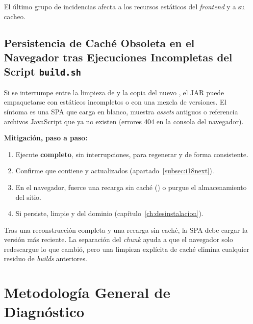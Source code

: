 El último grupo de incidencias afecta a los recursos estáticos del \textit{frontend} y a su
cacheo.\par

\subsection[Caché Obsoleta tras build.sh Incompleto]{Persistencia de Caché Obsoleta en el Navegador tras Ejecuciones Incompletas del Script \texttt{build.sh}}%
\label{sec:error-cache}

Si  se interrumpe entre la limpieza de  y la copia del
nuevo , el JAR puede empaquetarse con estáticos incompletos o con una mezcla
de versiones. El síntoma es una SPA que carga en blanco, muestra \textit{assets} antiguos o
referencia archivos JavaScript que ya no existen (errores 404 en la consola del navegador).\par

\textbf{Mitigación, paso a paso:}\par
\begin{enumerate}[noitemsep]
    \item Ejecute  \textbf{completo}, sin interrupciones, para regenerar  y  de forma consistente.
    \item Confirme que  contiene  y  actualizados (apartado~\ref{subsec:i18next}).
    \item En el navegador, fuerce una recarga sin caché () o purgue el almacenamiento del sitio.
    \item Si persiste, limpie  y  del dominio (capítulo~\ref{ch:desinstalacion}).
\end{enumerate}

\begin{VerificacionOK}
Tras una reconstrucción completa y una recarga sin caché, la SPA debe cargar la versión
más reciente. La separación del \textit{chunk}  ayuda a que el navegador
solo redescargue lo que cambió, pero una limpieza explícita de caché elimina cualquier
residuo de \textit{builds} anteriores.
\end{VerificacionOK}

\section{Metodología General de Diagnóstico}%
\label{sec:metodologia}


